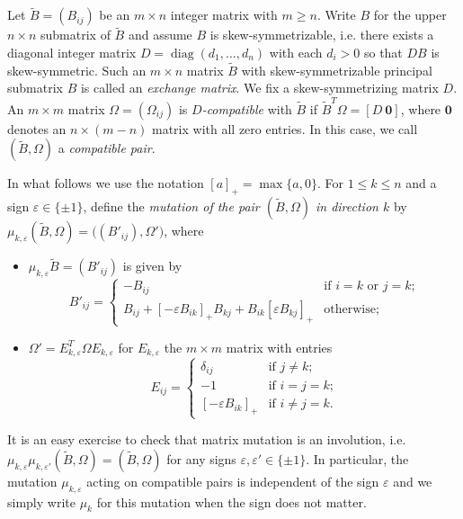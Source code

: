 \documentclass{amsart}
\newcommand{\diag}{\operatorname{diag}}
\renewcommand{\max}{\operatorname{max}}
\begin{document}
Let $\tilde B=(B_{ij})$ be an $m\times n$ integer matrix with $m\ge n$.  
Write $B$ for the upper $n\times n$ submatrix of $\tilde B$ and assume $B$ is skew-symmetrizable, i.e. there exists a diagonal integer matrix $D=\diag(d_1,\ldots,d_n)$ with each $d_i>0$ so that $DB$ is skew-symmetric. 
Such an $m\times n$ matrix $\tilde B$ with skew-symmetrizable principal submatrix $B$ is called an \emph{exchange matrix}.
We fix a skew-symmetrizing matrix $D$.
An $m\times m$ matrix $\Omega=(\Omega_{ij})$ is \emph{$D$-compatible} with $\tilde B$ if $\tilde B^T\Omega=[D\ \boldsymbol{0}]$, where $\boldsymbol{0}$ denotes an $n\times(m-n)$ matrix with all zero entries.
In this case, we call $(\tilde B,\Omega)$ a \emph{compatible pair}.

In what follows we use the notation $[a]_+=\max\{a,0\}$.
For $1\le k\le n$ and a sign $\varepsilon\in\{\pm1\}$, define the \emph{mutation of the pair $(\tilde B,\Omega)$ in direction $k$} by $\mu_{k,\varepsilon}(\tilde B,\Omega)=\big((B'_{ij}),\Omega'\big)$, where
\begin{itemize}
  \item $\mu_{k,\varepsilon}\tilde B=(B'_{ij})$ is given by
    \[B'_{ij}=\begin{cases}-B_{ij} & \text{if $i=k$ or $j=k$;}\\ B_{ij}+[-\varepsilon B_{ik}]_+B_{kj}+B_{ik}[\varepsilon B_{kj}]_+ & \text{otherwise;}\end{cases}\]
  \item $\Omega'=E_{k,\varepsilon}^T\Omega E_{k,\varepsilon}$ for $E_{k,\varepsilon}$ the $m\times m$ matrix with entries
    \[E_{ij}=\begin{cases}\delta_{ij} & \text{if $j\ne k$;}\\ -1 & \text{if $i=j=k$;}\\ [-\varepsilon B_{ik}]_+ & \text{if $i\ne j=k$.}\end{cases}\]
\end{itemize}
It is an easy exercise to check that matrix mutation is an involution, i.e.\ $\mu_{k,\varepsilon}\mu_{k,\varepsilon'}(\tilde B,\Omega)=(\tilde B,\Omega)$ for any signs $\varepsilon,\varepsilon'\in\{\pm1\}$.
In particular, the mutation $\mu_{k,\varepsilon}$ acting on compatible pairs is independent of the sign $\varepsilon$ and we simply write $\mu_k$ for this mutation when the sign does not matter.
\end{document}
